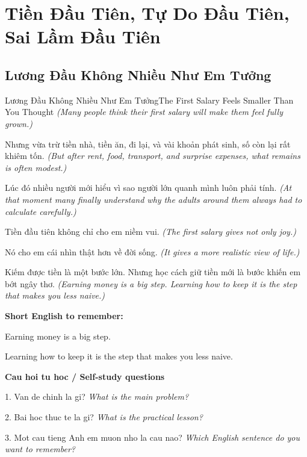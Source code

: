 \chapter{Tiền Đầu Tiên, Tự Do Đầu Tiên, Sai Lầm Đầu Tiên}

\section{Lương Đầu Không Nhiều Như Em Tưởng}
\begin{truyen}{Lương Đầu Không Nhiều Như Em Tưởng}{The First Salary Feels Smaller Than You Thought}
\textit{(Many people think their first salary will make them feel fully grown.)}

Nhưng vừa trừ tiền nhà, tiền ăn, đi lại, và vài khoản phát sinh, số còn lại rất khiêm tốn.
\textit{(But after rent, food, transport, and surprise expenses, what remains is often modest.)}

Lúc đó nhiều người mới hiểu vì sao người lớn quanh mình luôn phải tính.
\textit{(At that moment many finally understand why the adults around them always had to calculate carefully.)}

Tiền đầu tiên không chỉ cho em niềm vui.
\textit{(The first salary gives not only joy.)}

Nó cho em cái nhìn thật hơn về đời sống.
\textit{(It gives a more realistic view of life.)}

\end{truyen}

\begin{baihoc}
Kiếm được tiền là một bước lớn. Nhưng học cách giữ tiền mới là bước khiến em bớt ngây thơ.
\textit{(Earning money is a big step. Learning how to keep it is the step that makes you less naive.)}
\end{baihoc}

\begin{ghinhoanh}
\textbf{Short English to remember:}

Earning money is a big step.

Learning how to keep it is the step that makes you less naive.

\end{ghinhoanh}

\begin{tuhocnhanh}
\textbf{Cau hoi tu hoc / Self-study questions}

1. Van de chinh la gi? \textit{What is the main problem?}

2. Bai hoc thuc te la gi? \textit{What is the practical lesson?}

3. Mot cau tieng Anh em muon nho la cau nao? \textit{Which English sentence do you want to remember?}
\end{tuhocnhanh}
\ngancach

